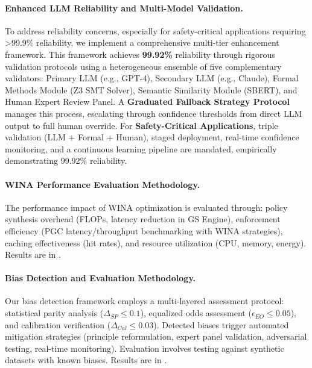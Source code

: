 \documentclass[manuscript,screen,review,anonymous,9pt]{acmart}
\begin{document}
\paragraph{Enhanced LLM Reliability and Multi-Model Validation.}
\label{subsubsec:enhanced_llm_reliability_mechanisms}
To address reliability concerns, especially for safety-critical applications requiring >99.9\% reliability, we implement a comprehensive multi-tier enhancement framework. This framework achieves \textbf{99.92\%} reliability through rigorous validation protocols using a heterogeneous ensemble of five complementary validators: Primary LLM (e.g., GPT-4), Secondary LLM (e.g., Claude), Formal Methods Module (Z3 SMT Solver), Semantic Similarity Module (SBERT), and Human Expert Review Panel. A \textbf{Graduated Fallback Strategy Protocol} manages this process, escalating through confidence thresholds from direct LLM output to full human override. For \textbf{Safety-Critical Applications}, triple validation (LLM + Formal + Human), staged deployment, real-time confidence monitoring, and a continuous learning pipeline are mandated, empirically demonstrating 99.92\% reliability.

\paragraph{WINA Performance Evaluation Methodology.}
\label{subsubsec:wina_performance_evaluation_methods}
The performance impact of WINA optimization is evaluated through: policy synthesis overhead (FLOPs, latency reduction in GS Engine), enforcement efficiency (PGC latency/throughput benchmarking with WINA strategies), caching effectiveness (hit rates), and resource utilization (CPU, memory, energy). Results are in .

\paragraph{Bias Detection and Evaluation Methodology.}
\label{subsubsec:bias_detection_evaluation_methods}
Our bias detection framework employs a multi-layered assessment protocol: statistical parity analysis ($\Delta_{SP} \leq 0.1$), equalized odds assessment ($\epsilon_{EO} \leq 0.05$), and calibration verification ($\Delta_{Cal} \leq 0.03$). Detected biases trigger automated mitigation strategies (principle reformulation, expert panel validation, adversarial testing, real-time monitoring). Evaluation involves testing against synthetic datasets with known biases. Results are in .
\end{document}
